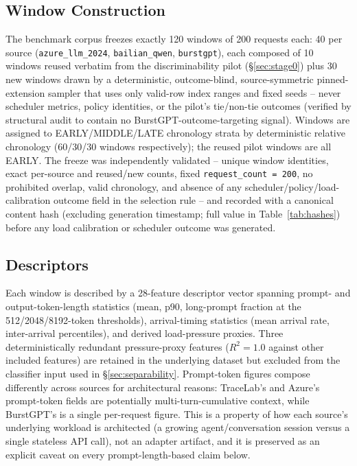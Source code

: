 \subsection{Window Construction}
\label{sec:windows}

The benchmark corpus freezes exactly 120 windows of 200 requests each: 40
per source (\texttt{azure\_llm\_2024}, \texttt{bailian\_qwen},
\texttt{burstgpt}), each composed of 10 windows reused verbatim from the
discriminability pilot (\S\ref{sec:stage0}) plus 30 new windows drawn by a
deterministic, outcome-blind, source-symmetric pinned-extension sampler
that uses only valid-row index ranges and fixed seeds -- never scheduler
metrics, policy identities, or the pilot's tie/non-tie outcomes (verified
by structural audit to contain no BurstGPT-outcome-targeting signal).
Windows are assigned to EARLY/MIDDLE/LATE chronology strata by
deterministic relative chronology (60/30/30 windows respectively); the
reused pilot windows are all EARLY. The freeze was independently
validated -- unique window identities, exact per-source and reused/new
counts, fixed \texttt{request\_count = 200}, no prohibited overlap, valid
chronology, and absence of any scheduler/policy/load-calibration outcome
field in the selection rule -- and recorded with a canonical content hash
(excluding generation timestamp; full value in Table~\ref{tab:hashes})
before any load calibration or scheduler outcome was generated.

\subsection{Descriptors}
\label{sec:descriptors}

Each window is described by a 28-feature descriptor vector spanning prompt-
and output-token-length statistics (mean, p90, long-prompt fraction at the
512/2048/8192-token thresholds), arrival-timing statistics (mean arrival
rate, inter-arrival percentiles), and derived load-pressure proxies. Three
deterministically redundant pressure-proxy features ($R^2=1.0$ against
other included features) are retained in the underlying dataset but
excluded from the classifier input used in \S\ref{sec:separability}.
Prompt-token figures compose differently across sources for architectural
reasons: TraceLab's and Azure's prompt-token fields are potentially
multi-turn-cumulative context, while BurstGPT's is a single per-request
figure. This is a property of how each source's underlying workload is
architected (a growing agent/conversation session versus a single stateless
API call), not an adapter artifact, and it is preserved as an explicit
caveat on every prompt-length-based claim below.

